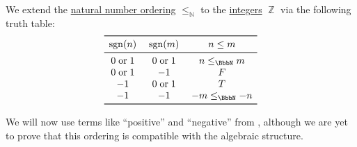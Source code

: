 \begin{definition}\label{def:integer_ordering}\mimprovised
  We extend the \hyperref[def:natural_numbers_ordering]{natural number ordering} \( \leq_\BbbN \) to the \hyperref[def:integers]{integers} \( \BbbZ \) via the following truth table:
  \begin{equation*}
    \begin{array}{c !{\thickspace} c !{\thickspace} c}
      \toprule
      \sgn(n)    & \sgn(m)    & n \leq m         \\
      \midrule
      0 \T{or} 1 & 0 \T{or} 1 & n \leq_\BbbN m   \\
      0 \T{or} 1 & -1         & F                \\
      -1         & 0 \T{or} 1 & T                \\
      -1         & -1         & -m \leq_\BbbN -n \\
      \bottomrule
    \end{array}
  \end{equation*}
\end{definition}
\begin{comments}
  \item We will now use terms like \enquote{positive} and \enquote{negative} from , although we are yet to prove that this ordering is compatible with the algebraic structure.
\end{comments}

